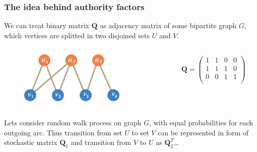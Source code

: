 \documentclass{beamer}
\newcommand{\mQ}{\mathbf{Q}}
\begin{document}
\begin{frame}
\frametitle{The idea behind authority factors}
We can treat binary matrix $\mQ$ as adjacency matrix of some bipartite graph
$G$, which vertices are splitted in two disjoined sets $U$ and $V$.
\begin{columns}[T] %
\begin{column}{.48\textwidth}
\begin{figure}[h] 
    \includegraphics[width=5cm]{DemoGraphQ.pdf}
\end{figure}
\end{column}%
\hfill%
\begin{column}{.48\textwidth}
\begin{eqnarray*}
\mQ = 
\left(
 \begin{array}{cccc}
    1& 1& 0& 0\\
    1& 1& 1& 0\\
    0& 0& 1& 1\\
  \end{array}
   \right)
\end{eqnarray*}
\end{column}%
\end{columns}
Lets consider random walk process on graph $G$, with equal probabilities for
each outgoing arc. 
Thus transition from set $U$ to set $V$ can be represented in form of
stochastic matrix $\mQ_1$ and transition from $V$ to $U$ as $\mQ_2^T$\ldots
\end{frame}
\end{document}
